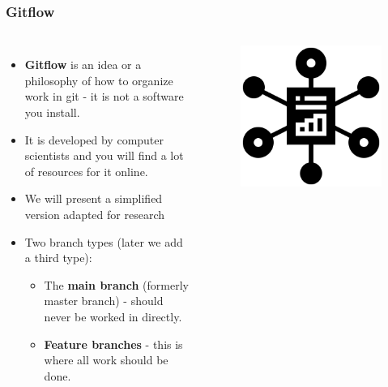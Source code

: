 \documentclass[aspectratio=169]{beamer}
\begin{document}
\begin{frame}
	\frametitle{Gitflow}
	\begin{columns}[c]

		\begin{itemize}
			\setlength\itemsep{.5em}
			\item \textbf{Gitflow} is an idea or a philosophy 
			of how to organize work in git - it is not a software you install.
			\item It is developed by computer scientists and
			you will find a lot of resources for it online.
			\item We will present a simplified version adapted for research
			\item Two branch types (later we add a third type):
			\begin{itemize}
				\item The \textbf{main branch} (formerly master branch)
				- should never be worked in directly.
				\item \textbf{Feature branches} - this is where all work should be done.
			\end{itemize}
		\end{itemize}

		\vspace{-.75cm}
		\begin{figure}
			\centering
			\includegraphics[width=.75\textwidth]{./img/organization.png}
		\end{figure}
	\end{columns}
\end{frame}
\end{document}
